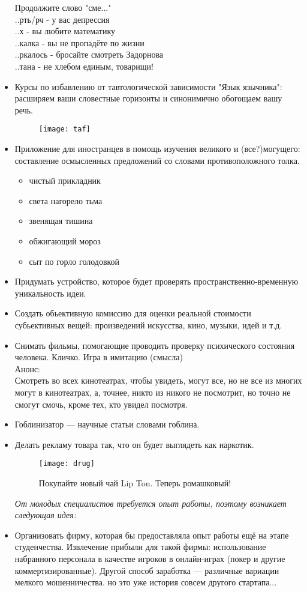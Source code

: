 \begin{itemize}
Продолжите слово "сме..."\\
..рть/рч - у вас депрессия\\
..х - вы любите математику\\
..калка - вы не пропадёте по жизни\\
..ркалось - бросайте смотреть Задорнова\\
..тана - не хлебом единым, товарищи!  
\item Курсы по избавлению от тавтологической зависимости "Язык язычника": расширяем ваши словестные горизонты и синонимично обогощаем вашу речь.
\begin{figure}[ht!]
    \centering
    \texttt{[image: taf]}
\end{figure}
\item Приложение для иностранцев в помощь изучения великого и (все?)могущего: составление осмысленных предложений со словами противоположного толка.
    \begin{itemize}
        \item чистый прикладник
        \item света нагорело тьма
        \item звенящая тишина
        \item обжигающий мороз
        \item сыт по горло голодовкой
    \end{itemize}
\item Придумать устройство, которое будет проверять пространственно-временную уникальность идеи.
\item Создать обьективную комиссию для оценки реальной стоимости субьективных вещей: произведений искусства, кино, музыки, идей и т.д.
\item Снимать фильмы, помогающие проводить проверку психического состояния человека.
Кличко. Игра в имитацию (смысла) \\
Анонс:\\
Смотреть во всех кинотеатрах, чтобы увидеть, могут все, но не все из многих могут в кинотеатрах, а, точнее, никто из никого не посмотрит, но точно не смогут смочь, кроме тех, кто увидел посмотря.
\item Гоблинизатор --- научные статьи словами гоблина.
\item Делать рекламу товара так, что он будет выглядеть как наркотик.
\begin{figure}[ht!]
    \centering
    \texttt{[image: drug]}
    \caption{Покупайте новый чай Lip Ton. Теперь ромашковый!}
\end{figure}
\emph{От молодых специалистов требуется опыт работы, поэтому возникает следующая идея:}
\item Организовать фирму, которая бы предоставляла опыт работы ещё на этапе студенчества. Извлечение прибыли для такой фирмы: использование набранного персонала в качестве игроков в онлайн-играх (покер и другие коммертизированные). Другой способ заработка --- различные вариации мелкого мошенничества. но это уже история совсем другого стартапа... 
\end{itemize}

